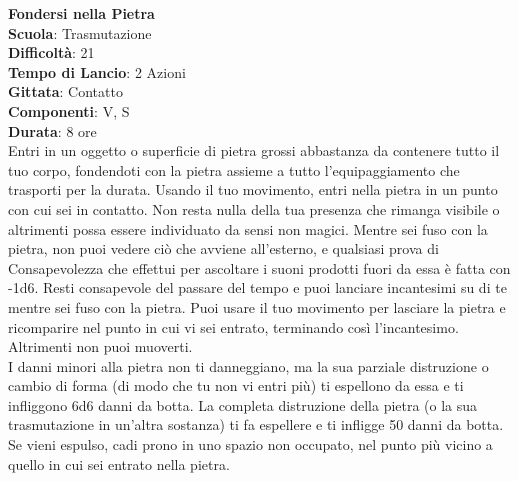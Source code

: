 \begin{multicols}{2}
\medskip\textbf{Fondersi nella Pietra}\\
\textbf{Scuola}: Trasmutazione\\
\textbf{Difficoltà}: 21\\
\textbf{Tempo di Lancio}: 2 Azioni\\
\textbf{Gittata}: Contatto\\
\textbf{Componenti}: V, S\\
\textbf{Durata}: 8 ore\\
Entri in un oggetto o superficie di pietra grossi abbastanza da contenere tutto il tuo corpo, fondendoti con la pietra assieme a tutto l'equipaggiamento che trasporti per la durata. Usando il tuo movimento, entri nella pietra in un punto con cui sei in contatto. Non resta nulla della tua presenza che rimanga visibile o altrimenti possa essere individuato da sensi non magici. Mentre sei fuso con la pietra, non puoi vedere ciò che avviene all'esterno, e qualsiasi prova di Consapevolezza che effettui per ascoltare i suoni prodotti fuori da essa è fatta con -1d6. Resti consapevole del passare del tempo e puoi lanciare incantesimi su di te mentre sei fuso con la pietra. Puoi usare il tuo movimento per lasciare la pietra e ricomparire nel punto in cui vi sei entrato, terminando così l'incantesimo. Altrimenti non puoi muoverti.\\
I danni minori alla pietra non ti danneggiano, ma la sua parziale distruzione o cambio di forma (di modo che tu non vi entri più) ti espellono da essa e ti infliggono 6d6 danni da botta. La completa distruzione della pietra (o la sua trasmutazione in un'altra sostanza) ti fa espellere e ti infligge 50 danni da botta. Se vieni espulso, cadi prono in uno spazio non occupato, nel punto più vicino a quello in cui sei entrato nella pietra.


\end{multicols}
